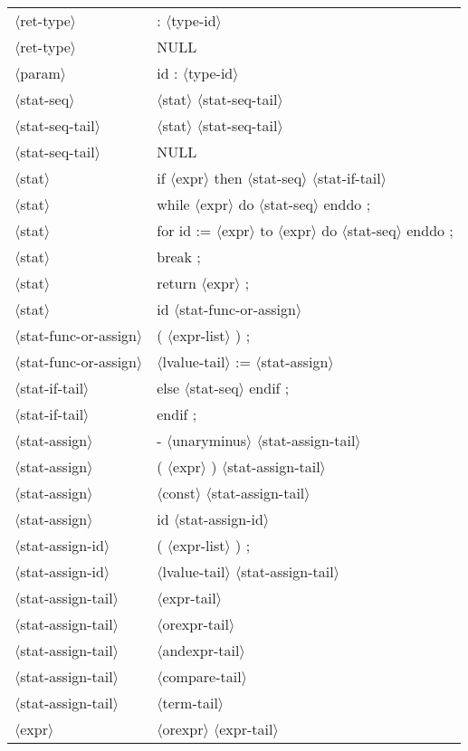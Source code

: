 \documentclass[11pt, fleqn]{article}
\newcommand{\atag}[1]{$\langle$#1$\rangle$}
\begin{document}
\begin{longtable}{l|l}
\atag{ret-type}					&	: \atag{type-id}		\\
\atag{ret-type}					&	NULL		\\
\atag{param}						&	id : \atag{type-id}		\\
\atag{stat-seq}					&	\atag{stat} \atag{stat-seq-tail}		\\
\atag{stat-seq-tail}				&	\atag{stat} \atag{stat-seq-tail}		\\
\atag{stat-seq-tail}				&	NULL		\\
\atag{stat}						&	if \atag{expr} then \atag{stat-seq} \atag{stat-if-tail}		\\
\atag{stat}						&	while \atag{expr} do \atag{stat-seq} enddo ;		\\
\atag{stat}						&	for id := \atag{expr} to \atag{expr} do \atag{stat-seq} enddo ;		\\
\atag{stat}						&	break ;		\\
\atag{stat}						&	return \atag{expr} ;		\\
\atag{stat}						&	id \atag{stat-func-or-assign}	\\
\atag{stat-func-or-assign}		&	( \atag{expr-list} ) ;	\\
\atag{stat-func-or-assign}		&	\atag{lvalue-tail} := \atag{stat-assign}	\\
\atag{stat-if-tail}				&	else \atag{stat-seq} endif ;		\\
\atag{stat-if-tail}				&	endif ;		\\
\atag{stat-assign}				&	- \atag{unaryminus} \atag{stat-assign-tail}	\\
\atag{stat-assign}				&	( \atag{expr} ) \atag{stat-assign-tail}	\\
\atag{stat-assign}				&	\atag{const}	 \atag{stat-assign-tail}		\\
\atag{stat-assign}				&	id \atag{stat-assign-id}	\\
\atag{stat-assign-id}			&	( \atag{expr-list} ) ;	\\
\atag{stat-assign-id}			&	\atag{lvalue-tail} \atag{stat-assign-tail}	\\
\atag{stat-assign-tail}			&	\atag{expr-tail}		\\
\atag{stat-assign-tail}			&	\atag{orexpr-tail}		\\
\atag{stat-assign-tail}			&	\atag{andexpr-tail}		\\
\atag{stat-assign-tail}			&	\atag{compare-tail}		\\
\atag{stat-assign-tail}			&	\atag{term-tail}		\\
\atag{expr}						&	\atag{orexpr} \atag{expr-tail}		\\

\end{longtable}
\end{document}
